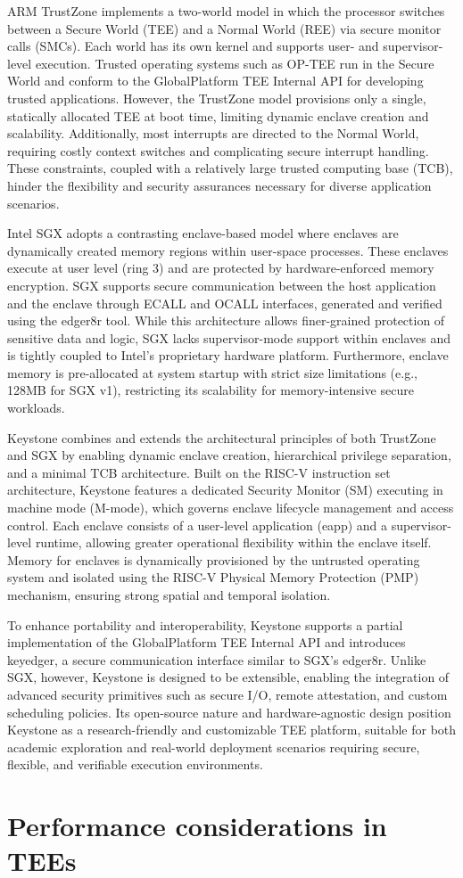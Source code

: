 ARM TrustZone implements a two-world model in which the processor switches between a Secure World (TEE) and a Normal World (REE) via secure monitor calls (SMCs). Each world has its own kernel and supports user- and supervisor-level execution. Trusted operating systems such as OP-TEE run in the Secure World and conform to the GlobalPlatform TEE Internal API for developing trusted applications. However, the TrustZone model provisions only a single, statically allocated TEE at boot time, limiting dynamic enclave creation and scalability. Additionally, most interrupts are directed to the Normal World, requiring costly context switches and complicating secure interrupt handling. These constraints, coupled with a relatively large trusted computing base (TCB), hinder the flexibility and security assurances necessary for diverse application scenarios.

Intel SGX adopts a contrasting enclave-based model where enclaves are dynamically created memory regions within user-space processes. These enclaves execute at user level (ring 3) and are protected by hardware-enforced memory encryption. SGX supports secure communication between the host application and the enclave through ECALL and OCALL interfaces, generated and verified using the edger8r tool. While this architecture allows finer-grained protection of sensitive data and logic, SGX lacks supervisor-mode support within enclaves and is tightly coupled to Intel's proprietary hardware platform. Furthermore, enclave memory is pre-allocated at system startup with strict size limitations (e.g., 128MB for SGX v1), restricting its scalability for memory-intensive secure workloads.

Keystone combines and extends the architectural principles of both TrustZone and SGX by enabling dynamic enclave creation, hierarchical privilege separation, and a minimal TCB architecture. Built on the RISC-V instruction set architecture, Keystone features a dedicated Security Monitor (SM) executing in machine mode (M-mode), which governs enclave lifecycle management and access control. Each enclave consists of a user-level application (eapp) and a supervisor-level runtime, allowing greater operational flexibility within the enclave itself. Memory for enclaves is dynamically provisioned by the untrusted operating system and isolated using the RISC-V Physical Memory Protection (PMP) mechanism, ensuring strong spatial and temporal isolation.

To enhance portability and interoperability, Keystone supports a partial implementation of the GlobalPlatform TEE Internal API and introduces keyedger, a secure communication interface similar to SGX's edger8r. Unlike SGX, however, Keystone is designed to be extensible, enabling the integration of advanced security primitives such as secure I/O, remote attestation, and custom scheduling policies. Its open-source nature and hardware-agnostic design position Keystone as a research-friendly and customizable TEE platform, suitable for both academic exploration and real-world deployment scenarios requiring secure, flexible, and verifiable execution environments.


\section{Performance considerations in TEEs}